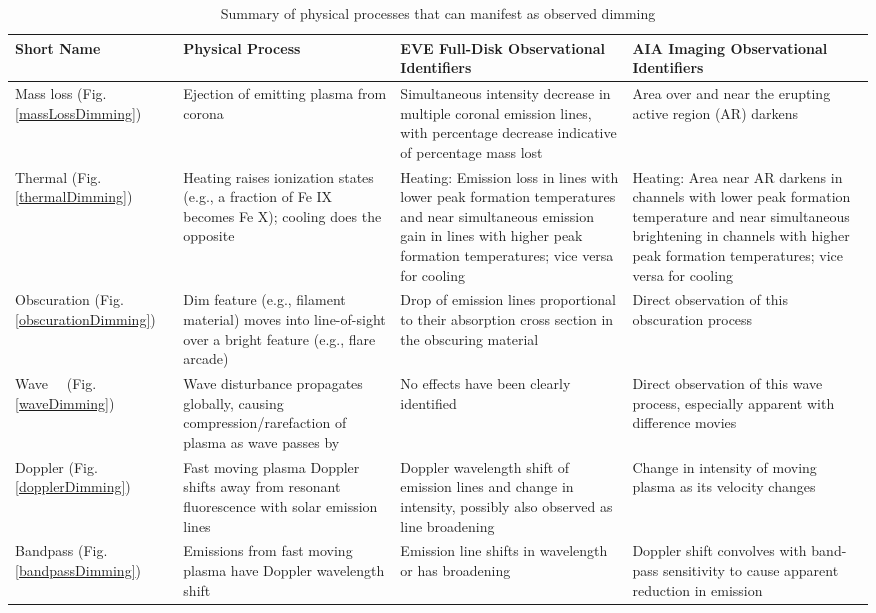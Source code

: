 \begin{table}[!t]
    \caption[Dimming mechanisms summary]{
        Summary of physical processes that can manifest as observed dimming
    }
    \begin{center}
    \begin{tabular}{|p{1.9cm}|p{4cm}|p{4cm}|p{4cm}|} \hline
	Short Name & Physical Process & EVE Full-Disk Observational Identifiers & AIA Imaging Observational Identifiers \\ \hline \hline
	
	Mass loss (Fig. \ref{massLossDimming}) & Ejection of emitting plasma from corona & Simultaneous intensity decrease in multiple coronal emission lines, with percentage decrease indicative of percentage mass lost & Area over and near the erupting active region (AR) darkens \\ \hline
	
	Thermal (Fig. \ref{thermalDimming}) & Heating raises ionization states (e.g., a fraction of Fe IX becomes Fe X); cooling does the opposite & Heating: Emission loss in lines with lower peak formation temperatures and near simultaneous emission gain in lines with higher peak formation temperatures; vice versa for cooling & Heating: Area near AR darkens in channels with lower peak formation temperature and near simultaneous brightening in channels with higher peak formation temperatures; vice versa for cooling \\ \hline
	
	Obscuration (Fig. \ref{obscurationDimming}) & Dim feature (e.g., filament material) moves into line-of-sight over a bright feature (e.g., flare arcade) & Drop of emission lines proportional to their absorption cross section in the obscuring material & Direct observation of this obscuration process \\ \hline
	
	Wave \ \ (Fig. \ref{waveDimming}) & Wave disturbance propagates globally, causing compression/rarefaction of plasma as wave passes by & No effects have been clearly identified & Direct observation of this wave process, especially apparent with difference movies \\ \hline
	
	Doppler (Fig. \ref{dopplerDimming}) & Fast moving plasma Doppler shifts away from resonant fluorescence with solar emission lines & Doppler wavelength shift of emission lines and change in intensity, possibly also observed as line broadening & Change in intensity of moving plasma as its velocity changes \\ \hline
	
	Bandpass (Fig. \ref{bandpassDimming}) & Emissions from fast moving plasma have Doppler wavelength shift & Emission line shifts in wavelength or has broadening & Doppler shift convolves with band-pass sensitivity to cause apparent reduction in emission \\ \hline
	
	\end{tabular}
    \\ \rule{0mm}{5mm}
    \end{center}
    \label{tablesummary}
\end{table}

